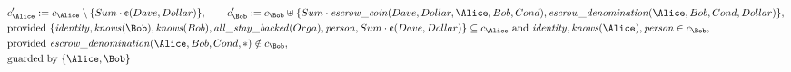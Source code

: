 \begin{align*}
&
c'_
{
\Alice
}
 := 
c_
{
\Alice
}
 \setminus 
\{
Sum
\cdot
\text{\textcent}
(
Dave
,
Dollar
)
\}
, \qquad 
c'_
{
\Bob
}
 := 
c_
{
\Bob
}
 \uplus 
\{
Sum
\cdot
\mathit{\detokenize{
escrow_coin
}}
(
Dave
,
Dollar
,
\Alice
,
Bob
,
Cond
)
,
\mathit{\detokenize{
escrow_denomination
}}
(
\Alice
,
Bob
,
Cond
,
Dollar
)
\}
,\\
&
\text{provided } 
\{
\mathit{\detokenize{
identity
}}
,
\mathit{\detokenize{
knows
}}
(
\Bob
)
,
\mathit{\detokenize{
knows
}}
(
Bob
)
,
\mathit{\detokenize{
all_stay_backed
}}
(
Orga
)
,
\mathit{\detokenize{
person
}}
,
Sum
\cdot
\text{\textcent}
(
Dave
,
Dollar
)
\}
 \subseteq c_
{
\Alice
}
 \text{ and } 
\mathit{\detokenize{
identity
}}
,
\mathit{\detokenize{
knows
}}
(
\Alice
)
,
\mathit{\detokenize{
person
}}
 \in c_
{
\Bob
}
,\\
&
\text{provided } 
\mathit{\detokenize{
escrow_denomination
}}
(
\Alice
,
Bob
,
Cond
,
\ast
)
 \notin c_
{
\Bob
}
,\\
&
\text{guarded by } \{
\Alice
,
\Bob
\}
\end{align*}


